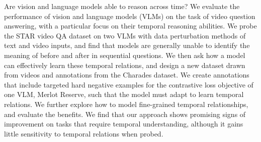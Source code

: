 \documentclass[12pt]{report}
\begin{document}

Are vision and language models able to reason across time? We evaluate the
performance of vision and language models (VLMs) on the task of video question
answering, with a particular focus on their temporal reasoning abilities. We
probe the STAR video QA dataset on two VLMs with data perturbation methods of
text and video inputs, and find that models are generally unable to identify
the meaning of before and after in sequential questions. We then ask how a
model can effectively learn these temporal relations, and design a new dataset
drawn from videos and annotations from the Charades dataset. We create
annotations that include targeted hard negative examples for the contrastive
loss objective of one VLM, Merlot Reserve, such that the model must adapt to
learn temporal relations. We further explore how to model fine-grained temporal
relationships, and evaluate the benefits. We find that our approach shows
promising signs of improvement on tasks that require temporal understanding,
although it gains little sensitivity to temporal relations when probed.
\end{document}
